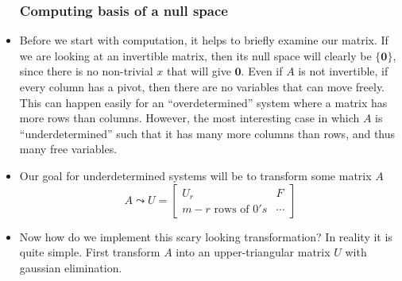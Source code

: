 \documentclass[11pt]{article}
\begin{document}
		\begin{itemize}
			\subsubsection*{Computing basis of a null space}
		\item Before we start with computation, it helps to briefly examine our matrix. If we are looking at an invertible matrix, then its null space will clearly be $\{ \bm{0}\}$, since there is no non-trivial $x$ that will give $\bm{0}$. Even if $A$ is not invertible, if every column has a pivot, then there are no variables that can move freely. This can happen easily for an ``overdetermined'' system where a matrix has more rows than columns. However, the most interesting case in which $A$ is ``underdetermined'' such that it has many more columns than rows, and thus many free variables.
		\item Our goal for underdetermined systems will be to transform some matrix $A$
			$$A \leadsto U = \begin{bmatrix}
			  U_r & F \\
			  m-r \text{ rows of }0's & \cdots
			\end{bmatrix}$$
		\item Now how do we implement this scary looking transformation? In reality it is quite simple. First transform $A$ into an upper-triangular matrix $U$ with gaussian elimination.


\end{itemize}
\end{document}
